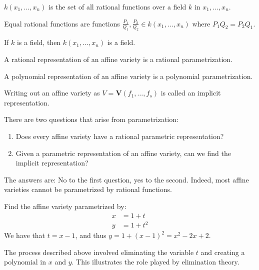 \documentclass[crop=false,class=article,oneside]{standalone}
\begin{document}
    \begin{definition}
    $k(x_1,\hdots ,x_n)$ is the set of all rational functions over a field $k$ in $x_1,\hdots, x_n$.
    \end{definition}
    \begin{definition}
    Equal rational functions are functions $\frac{P_1}{Q_1}, \frac{P_2}{Q_2} \in k(x_1,\hdots ,x_n)$ where $P_1Q_2 = P_2Q_1$.
    \end{definition}
    \begin{theorem}
    If $k$ is a field, then $k(x_1,\hdots ,x_n)$ is a field.
    \end{theorem}
    \begin{definition}
    A rational representation of an affine variety is a rational parametrization.
    \end{definition}
    \begin{definition}
    A polynomial representation of an affine variety is a polynomial parametrization.
    \end{definition}
    \begin{remark}
    Writing out an affine variety as $V=\mathbf{V}(f_{1},\hdots,f_{s})$ is called an implicit representation.
    \end{remark}
    There are two questions that arise from parametrization:
    \begin{enumerate}
        \item Does every affine variety have a rational parametric representation?
        \item Given a parametric representation of an affine variety, can we find the implicit representation?
    \end{enumerate}
    The answers are: No to the first question, yes to the second. Indeed, most affine varieties cannot be parametrized by rational functions.
    \begin{example}
    Find the affine variety parametrized by:
    \begin{align*}
        x&=1+t\\
        y&=1+t^{2}
    \end{align*}
    We have that $t=x-1$, and thus $y=1+(x-1)^{2}=x^{2}-2x+2$.
    \end{example}
    \begin{remark}
    The process described above involved eliminating the variable $t$ and creating a polynomial in $x$ and $y$. This illustrates the role played by elimination theory.
    \end{remark}
\end{document}
